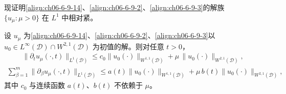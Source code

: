 \documentclass[../../main.tex]{subfiles}
\begin{document}
现证明\eqref{align:ch06-6-9-14}、\eqref{align:ch06-6-9-2}、\eqref{align:ch06-6-9-3}的解族 $\{u_{\mu}:\mu>0\}$ 在 $L^{1}$ 中相对紧。

\begin{lemma}\label{lemma:ch06-6-9-5}
设 $u_{\mu}$ 为\eqref{align:ch06-6-9-14}、\eqref{align:ch06-6-9-2}、\eqref{align:ch06-6-9-3}以 $u_{0}\in L^{\infty}(\mathscr{D})\cap W^{2,1}(\mathscr{D})$ 为初值的解。则对任意 $t>0$，
\begin{align}
\|\partial_{t}u_{\mu}(\cdot,t)\|_{L^{1}(\mathscr{D})}\leqslant c_{0}\|u_{0}(\cdot)\|_{W^{1,1}(\mathscr{D})}+\mu\,\|u_{0}(\cdot)\|_{W^{2,1}(\mathscr{D})},
\label{align:ch06-6-9-20}
\end{align}
\begin{align}
\sum_{\beta=1}^{m}\|\partial_{\beta}u_{\mu}(\cdot,t)\|_{L^{1}(\mathscr{D})}\leqslant a(t)\|u_{0}(\cdot)\|_{W^{1,1}(\mathscr{D})}+\mu\,b(t)\|u_{0}(\cdot)\|_{W^{2,1}(\mathscr{D})},
\label{align:ch06-6-9-21}
\end{align}
其中 $c_{0}$ 与连续函数 $a(t)$、$b(t)$ 不依赖于 $\mu$。
\end{lemma}
\end{document}
